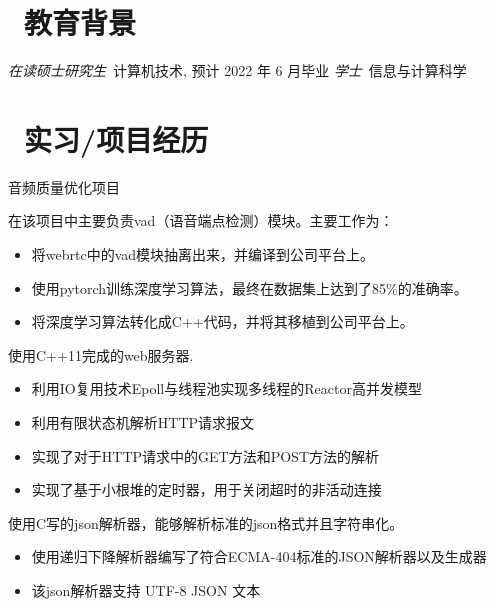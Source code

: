 \documentclass{resume}
\begin{document}



\section{\faGraduationCap\  教育背景}
\textit{在读硕士研究生}\ 计算机技术, 预计 2022 年 6 月毕业
\textit{学士}\ 信息与计算科学

\section{\faUsers\ 实习/项目经历}
 {音频质量优化项目}
\begin{onehalfspacing}
    在该项目中主要负责vad（语音端点检测）模块。主要工作为：
    \begin{itemize}
        \item 将webrtc中的vad模块抽离出来，并编译到公司平台上。
        \item 使用pytorch训练深度学习算法，最终在数据集上达到了85\%的准确率。
        \item 将深度学习算法转化成C++代码，并将其移植到公司平台上。
    \end{itemize}
\end{onehalfspacing}


\begin{onehalfspacing}
    使用C++11完成的web服务器.
    \begin{itemize}
        \item 利用IO复用技术Epoll与线程池实现多线程的Reactor高并发模型
        \item 利用有限状态机解析HTTP请求报文
        \item 实现了对于HTTP请求中的GET方法和POST方法的解析
        \item 实现了基于小根堆的定时器，用于关闭超时的非活动连接
    \end{itemize}
\end{onehalfspacing}

\begin{onehalfspacing}
    使用C写的json解析器，能够解析标准的json格式并且字符串化。
    \begin{itemize}
        \item 使用递归下降解析器编写了符合ECMA-404标准的JSON解析器以及生成器
        \item 该json解析器支持 UTF-8 JSON 文本
    \end{itemize}
\end{onehalfspacing}
\end{document}
